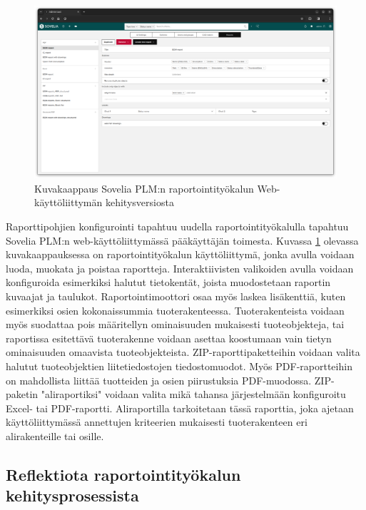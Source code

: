 \begin{figure}[h!]
\includegraphics[width=1\textwidth]{img/RAT.png}
\caption{Kuvakaappaus Sovelia PLM:n raportointityökalun Web-käyttöliittymän kehitysversiosta\label{fig:RAT}}
\end{figure}

Raporttipohjien konfigurointi tapahtuu uudella raportointityökalulla tapahtuu Sovelia PLM:n web-käyttöliittymässä pääkäyttäjän toimesta. Kuvassa \ref{fig:RAT} olevassa kuvakaappauksessa on raportointityökalun käyttöliittymä, jonka avulla voidaan luoda, muokata ja poistaa raportteja. Interaktiivisten valikoiden avulla voidaan konfiguroida esimerkiksi halutut tietokentät, joista muodostetaan raportin kuvaajat ja taulukot. Raportointimoottori osaa myös laskea lisäkenttiä, kuten esimerkiksi osien kokonaissummia tuoterakenteessa. Tuoterakenteista voidaan myös suodattaa pois määritellyn ominaisuuden mukaisesti tuoteobjekteja, tai raportissa esitettävä tuoterakenne voidaan asettaa koostumaan vain tietyn ominaisuuden omaavista tuoteobjekteista. ZIP-raporttipaketteihin voidaan valita halutut tuoteobjektien liitetiedostojen tiedostomuodot. Myös PDF-raportteihin on mahdollista liittää tuotteiden ja osien piirustuksia PDF-muodossa. ZIP-paketin "aliraportiksi" voidaan valita mikä tahansa järjestelmään konfiguroitu Excel- tai PDF-raportti. Aliraportilla tarkoitetaan tässä raporttia, joka ajetaan käyttöliittymässä annettujen kriteerien mukaisesti tuoterakenteen eri alirakenteille tai osille.


\subsection{Reflektiota raportointityökalun kehitysprosessista}

